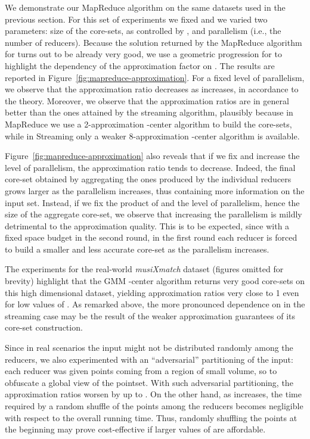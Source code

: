 \documentclass{article}
\begin{document}
We demonstrate our MapReduce algorithm on the same datasets used in
the previous section. For this set of experiments we fixed  and
we varied two parameters: size of the core-sets, as controlled by
, and parallelism (i.e., the number of reducers).  Because the
solution returned by the MapReduce algorithm for  turns out to
be already very good, we use a geometric progression for  to
highlight the dependency of the approximation factor on .  The
results are reported in Figure~\ref{fig:mapreduce-approximation}.  For
a fixed level of parallelism, we observe that the approximation ratio
decreases as  increases, in accordance to the theory.  Moreover,
we observe that the approximation ratios are in general better than
the ones attained by the streaming algorithm, plausibly because in
MapReduce we use a 2-approximation -center algorithm to build the
core-sets, while in Streaming only a weaker 8-approximation
-center algorithm is available.

Figure~\ref{fig:mapreduce-approximation} also reveals that if we fix
 and increase the level of parallelism, the approximation ratio
tends to decrease.  Indeed, the final core-set obtained by aggregating
the ones produced by the individual reducers grows larger as the
parallelism increases, thus containing more information on the input
set.  Instead, if we fix the product of  and the level of
parallelism, hence the size of the aggregate core-set, we observe that
increasing the parallelism is mildly detrimental to the approximation
quality.  This is to be expected, since with a fixed space budget in
the second round, in the first round each reducer is forced to build a
smaller and less accurate core-set as the parallelism increases.

The experiments for the real-world \emph{musiXmatch} dataset (figures
omitted for brevity) highlight that the {\sc GMM} -center
algorithm returns very good core-sets on this high dimensional
dataset, yielding approximation ratios very close to 1 even for low
values of . As remarked above, the more pronounced dependence on
 in the streaming case may be the result of the weaker approximation
guarantees of its core-set construction.


Since in real scenarios the input might not be distributed randomly
among the reducers, we also experimented with an ``adversarial''
partitioning of the input: each reducer was given points coming from a
region of small volume, so to obfuscate a global view of the
pointset. With such adversarial partitioning, the approximation ratios
worsen by up to . On the other hand, as  increases, the
time required by a random shuffle of the points among the reducers
becomes negligible with respect to the overall running time. Thus,
randomly shuffling the points at the beginning may prove
cost-effective if larger values of  are affordable.
\end{document}
